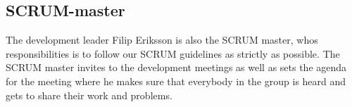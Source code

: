 \subsection{SCRUM-master}
The development leader Filip Eriksson is also the SCRUM master, whos responsibilities is to follow our SCRUM guidelines as strictly as possible. The SCRUM master invites to the development meetings as well as sets the agenda for the meeting where he makes sure that everybody in the group is heard and gets to share their work and problems. 

